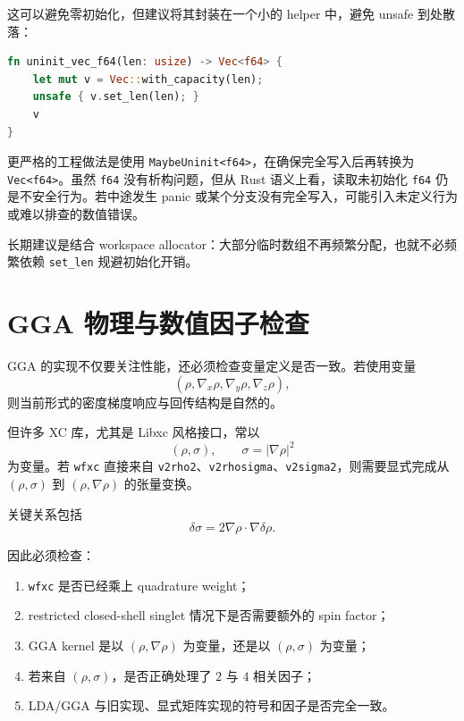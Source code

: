 \documentclass[11pt,a4paper]{ctexart}
\begin{document}
这可以避免零初始化，但建议将其封装在一个小的 helper 中，避免 unsafe 到处散落：

\begin{lstlisting}[language=Rust,style=code]
fn uninit_vec_f64(len: usize) -> Vec<f64> {
    let mut v = Vec::with_capacity(len);
    unsafe { v.set_len(len); }
    v
}
\end{lstlisting}

更严格的工程做法是使用 \texttt{MaybeUninit<f64>}，在确保完全写入后再转换为 \texttt{Vec<f64>}。虽然 \texttt{f64} 没有析构问题，但从 Rust 语义上看，读取未初始化 \texttt{f64} 仍是不安全行为。若中途发生 panic 或某个分支没有完全写入，可能引入未定义行为或难以排查的数值错误。

长期建议是结合 workspace allocator：大部分临时数组不再频繁分配，也就不必频繁依赖 \texttt{set\_len} 规避初始化开销。

\section{GGA 物理与数值因子检查}

GGA 的实现不仅要关注性能，还必须检查变量定义是否一致。若使用变量
\begin{equation}
  (\rho,\nabla_x\rho,\nabla_y\rho,\nabla_z\rho),
\end{equation}
则当前形式的密度梯度响应与回传结构是自然的。

但许多 XC 库，尤其是 Libxc 风格接口，常以
\begin{equation}
  (\rho,\sigma),\qquad \sigma=|\nabla\rho|^2
\end{equation}
为变量。若 \texttt{wfxc} 直接来自 \texttt{v2rho2}、\texttt{v2rhosigma}、\texttt{v2sigma2}，则需要显式完成从 $(\rho,\sigma)$ 到 $(\rho,\nabla\rho)$ 的张量变换。

关键关系包括
\begin{equation}
  \delta\sigma = 2\nabla\rho\cdot\nabla\delta\rho.
\end{equation}

因此必须检查：

\begin{enumerate}[leftmargin=2em]
  \item \texttt{wfxc} 是否已经乘上 quadrature weight；
  \item restricted closed-shell singlet 情况下是否需要额外的 spin factor；
  \item GGA kernel 是以 $(\rho,\nabla\rho)$ 为变量，还是以 $(\rho,\sigma)$ 为变量；
  \item 若来自 $(\rho,\sigma)$，是否正确处理了 $2$ 与 $4$ 相关因子；
  \item LDA/GGA 与旧实现、显式矩阵实现的符号和因子是否完全一致。
\end{enumerate}
\end{document}
